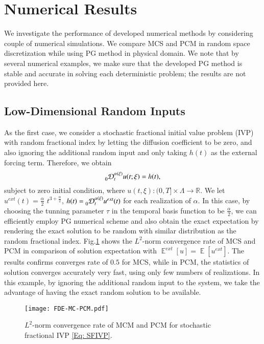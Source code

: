 

%
\section{\textbf{Numerical Results}}
\label{Sec: numerical results}
%
We investigate the performance of developed numerical methods by considering couple of numerical simulations. We compare MCS and PCM in random space discretization while using PG method in physical domain. We note that by several numerical examples, we make sure that the developed PG method is stable and accurate in solving each deterministic problem; the results are not provided here.


%
\subsection{Low-Dimensional Random Inputs}
%
As the first case, we consider a stochastic fractional initial value problem (IVP) with random fractional index by letting the diffusion coefficient to be zero, and also ignoring the additional random input and only taking $h(t)$ as the external forcing term. Therefore, we obtain
%
\begin{equation}
%
\label{Eq: SFIVP}
\prescript{}{0}{\mathcal{D}}_{t}^{\alpha(\xi)}  u(t;\xi) = h(t),
%
\end{equation}
%
subject to zero initial condition, where $u(t,\xi): (0,T] \times \Lambda \rightarrow \mathbb{R}$. We let $ u^{ext}(t) = \frac{\alpha}{2} \,\, t^{3+\frac{\alpha}{2}} $, $ h(t) = \prescript{}{0}{\mathcal{D}}_{t}^{\alpha(\xi)} u^{ext}(t) $ for each realization of $\alpha$. In this case, by choosing the tunning parameter $\tau$ in the temporal basis function to be $\frac{\alpha}{2}$, we can efficiently employ PG numerical scheme and also obtain the exact expectation by rendering the exact solution to be random with similar distribution as the random fractional index. Fig.\ref{Fig: MCM PCM SFIVP} shows the $L^2$-norm convergence rate of MCS and PCM in comparison of solution expectation with $\mathop{\mathbb{E}}^{ext}[u] = \mathop{\mathbb{E}}[u^{ext}]$. The results confirms converges rate of $0.5$ for MCS, while in PCM, the statistics of solution converges accurately very fast, using only few numbers of realizations. In this example, by ignoring the additional random input to the system, we take the advantage of having the exact random solution to be available. 
%
%
\begin{figure}[t]
	\centering
	\texttt{[image: FDE-MC-PCM.pdf]}
	\caption{$L^2$-norm convergence rate of MCM and PCM for stochastic fractional IVP \eqref{Eq: SFIVP}.}
	\label{Fig: MCM PCM SFIVP}
\end{figure}
%
%


